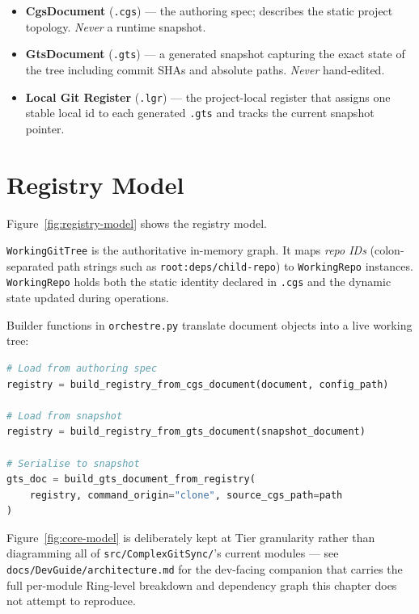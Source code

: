 \begin{itemize}
  \item \textbf{CgsDocument} (\texttt{.cgs}) — the authoring spec; describes
    the static project topology.  \emph{Never} a runtime snapshot.
  \item \textbf{GtsDocument} (\texttt{.gts}) — a generated snapshot capturing
    the exact state of the tree including commit SHAs and absolute paths.
    \emph{Never} hand-edited.
  \item \textbf{Local Git Register} (\texttt{.lgr}) — the project-local
    register that assigns one stable local id to each generated \texttt{.gts}
    and tracks the current snapshot pointer.
\end{itemize}

\section{Registry Model}
\label{sec:registry-model}

Figure~\ref{fig:registry-model} shows the registry model.

\texttt{WorkingGitTree} is the authoritative in-memory graph.  It maps
\emph{repo IDs} (colon-separated path strings such as
\texttt{root:deps/child-repo}) to \texttt{WorkingRepo} instances.
\texttt{WorkingRepo} holds both the static identity declared in
\texttt{.cgs} and the dynamic state updated during operations.

Builder functions in \texttt{orchestre.py} translate document objects into a
live working tree:

\begin{lstlisting}[language=Python]
# Load from authoring spec
registry = build_registry_from_cgs_document(document, config_path)

# Load from snapshot
registry = build_registry_from_gts_document(snapshot_document)

# Serialise to snapshot
gts_doc = build_gts_document_from_registry(
    registry, command_origin="clone", source_cgs_path=path
)
\end{lstlisting}


Figure~\ref{fig:core-model} is deliberately kept at Tier granularity rather
than diagramming all of \texttt{src/ComplexGitSync/}'s current modules —
see \texttt{docs/DevGuide/architecture.md} for the dev-facing companion
that carries the full per-module Ring-level breakdown and dependency
graph this chapter does not attempt to reproduce.


